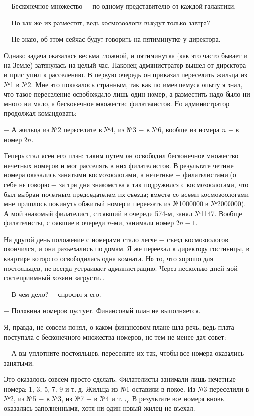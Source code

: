 \documentclass{article}
\begin{document}
\(-\) Бесконечное множество \(-\) по одному представителю от каждой галактики.

\(-\) Но как же их разместят, ведь космозоологи выедут только завтра?

\(-\) Не знаю, об этом сейчас будут говорить на пятиминутке у директора.

Однако задача оказалась весьма сложной, и пятиминутка (как это часто бывает и на Земле) затянулась на целый час. Наконец администратор вышел от директора и приступил к расселению. В первую очередь он приказал переселить жильца из №1 в №2. Мне это показалось странным, так как по имевшемуся опыту я знал, что такое переселение освобождало лишь один номер, а разместить надо было ни много ни мало, а бесконечное множество филателистов. Но администратор продолжал командовать:

\(-\) А жильца из №2 переселите в №4, из №3 \(-\) в №6, вообще из номера \(n\) \(-\) в номер \(2n\).

Теперь стал ясен его план: таким путем он освободил бесконечное множество нечетных номеров и мог расселять в них филателистов. В результате четные номера оказались занятыми космозоологами, а нечетные \(-\) филателистами (о себе не говорю \(-\) за три дня знакомства я так подружился с космозоологами, что был выбран почетным председателем их съезда; вместе со всеми космозоологами мне пришлось покинуть обжитый номер и переехать из №1000000 в №2000000). А мой знакомый филателист, стоявший в очереди 574-м, занял №1147. Вообще филателисты, стоявшие в очереди \(n\)-ми, занимали номер \(2n-1\).

На другой день положение с номерами стало легче \(-\) съезд космозоологов окончился, и они разъехались по домам. Я же переехал к директору гостиницы, в квартире которого освободилась одна комната. Но то, что хорошо для постояльцев, не всегда устраивает администрацию. Через несколько дней мой гостеприимный хозяин загрустил.

\(-\) В чем дело? \(-\) спросил я его.

\(-\) Половина номеров пустует. Финансовый план не выполняется.

Я, правда, не совсем понял, о каком финансовом плане шла речь, ведь плата поступала с бесконечного множества номеров, но тем не менее дал совет:

\(-\) А вы уплотните постояльцев, переселите их так, чтобы все номера оказались занятыми.

Это оказалось совсем просто сделать. Филателисты занимали лишь нечетные номера: 1, 3, 5, 7, 9 и т. д. Жильца из №1 оставили в покое. Из №3 переселили в №2, из №5 \(-\) в №3, из №7 \(-\) в №4 и т. д. В результате все номера вновь оказались заполненными, хотя ни один новый жилец не въехал.
\end{document}
